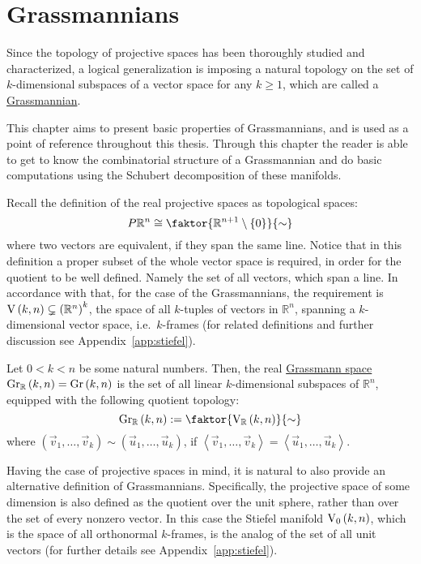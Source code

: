 \chapter{Grassmannians}
Since the topology of projective spaces has been thoroughly studied and characterized, a logical generalization is imposing a natural topology on the set of $k$-dimensional subspaces of a vector space for any $k\geq1$, which are called a \ul{Grassmannian}.

This chapter aims to present basic properties of Grassmannians, and is used as a point of reference throughout this thesis.
Through this chapter the reader is able to get to know the combinatorial structure of a Grassmannian and do basic computations using the Schubert decomposition of these manifolds.

Recall the definition of the real projective spaces as topological spaces:
\[P\mathbb{R}^n\cong\faktor{\mathbb{R}^{n+1}\setminus\{0\}}{\sim}\]
where two vectors are equivalent, if they span the same line. Notice that in this definition a proper subset of the whole vector space is required, in order for the quotient to be well defined. Namely the set of all vectors, which span a line. In accordance with that, for the case of the Grassmannians, the requirement is $\St{k}{n}\subsetneq{\left(\mathbb{R}^n\right)}^k$, the space of all $k$-tuples of vectors in $\mathbb{R}^n$, spanning a $k$-dimensional vector space, i.e.\ $k$-frames (for related definitions and further discussion see Appendix~\ref{app:stiefel}).

\begin{definition} Let $0<k<n$ be some natural numbers. Then, the real \ul{Grassmann space} $\Gr{k}{n}{\mathbb{R}}=\Gr{k}{n}$ is the set of all linear $k$-dimensional subspaces of $\mathbb{R}^n$, equipped with the following quotient topology:
\[\Gr{k}{n}{\mathbb{R}}:=\faktor{\St{k}{n}{\mathbb{R}}}{\sim}\]
where $(\vec{v}_1,\ldots,\vec{v}_k)\sim(\vec{u}_1,\ldots,\vec{u}_k)$, if $\left<\vec{v}_1,\ldots,\vec{v}_k\right>=\left<\vec{u}_1,\ldots,\vec{u}_k\right>$.
\end{definition}

Having the case of projective spaces in mind, it is natural to also provide an alternative definition of Grassmannians.
Specifically, the projective space of some dimension is also defined as the quotient over the unit sphere, rather than over the set of every nonzero vector.
In this case the Stiefel manifold $\StO{k}{n}$, which is the space of all orthonormal $k$-frames, is the analog of the set of all unit vectors (for further details see Appendix~\ref{app:stiefel}).

